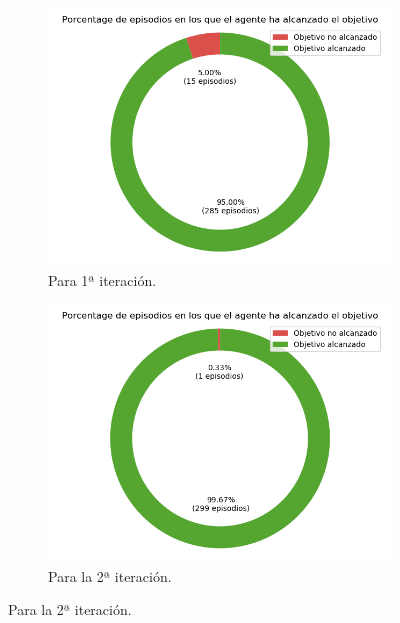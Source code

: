 \begin{figure}
    \centering
    \begin{subfigure}{.5\textwidth}
        \centering
        \includegraphics[scale=0.3]{cap5_experimentacion/images/CHANGE_ORIGIN-20_09-00_52-1, 0, 2_it1_porcentajeResuelto.png}
        \caption{Para 1ª iteración.}
        \label{fig:CHANGE_ORIGIN-20_09-00_52-1, 0, 2_it1_porcentajeResuelto}
    \end{subfigure}%
    \begin{subfigure}{.5\textwidth}
        \centering
        \includegraphics[scale=0.3]{cap5_experimentacion/images/CHANGE_ORIGIN-20_09-00_52-1, 0, 2_it2_porcentajeResuelto.png}
        \caption{Para la 2ª iteración.}
        \label{fig:CHANGE_ORIGIN-20_09-00_52-1, 0, 2_it2_porcentajeResuelto}

\end{subfigure}
\end{figure}
